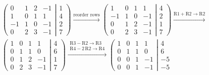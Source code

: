 \begin{align*}
  & \left(
  \begin{matrix}
  0 & 1 & 2 & -1 \\
  1 & 0 & 1 & 1 \\
  -1 & 1 & 0 & -1 \\
  0 & 2 & 3 & -1
  \end{matrix}
  \right.\left|\left.
  \begin{matrix}
  1 \\ 4 \\ 2 \\ 7 
  \end{matrix}
  \right)\right. 
  \xrightarrow{\text{reorder rows}}
  \left(
  \begin{matrix}
  1 & 0 & 1 & 1 \\
  -1 & 1 & 0 & -1 \\
  0 & 1 & 2 & -1 \\
  0 & 2 & 3 & -1
  \end{matrix}
  \right.\left|\left.
  \begin{matrix}
  4 \\ 2 \\ 1 \\ 7 
  \end{matrix}
  \right)\right.
  \xrightarrow{\text{R1}+\text{R2}\to\text{R2}} \\
  & \left(
  \begin{matrix}
  1 & 0 & 1 & 1 \\
  0 & 1 & 1 & 0 \\
  0 & 1 & 2 & -1 \\
  0 & 2 & 3 & -1
  \end{matrix}
  \right.\left|\left.
  \begin{matrix}
  4 \\ 6 \\ 1 \\ 7 
  \end{matrix}
  \right)\right.
  \xrightarrow{\substack{\text{R3}-\text{R2}\to\text{R3} \\
  \text{R4}-2\,\text{R2}\to\text{R4}}}
  \left(
  \begin{matrix}
  1 & 0 & 1 & 1 \\
  0 & 1 & 1 & 0 \\
  0 & 0 & 1 & -1 \\
  0 & 0 & 1 & -1
  \end{matrix}
  \right.\left|\left.
  \begin{matrix}
  4 \\ 6 \\ -5 \\ -5

\end{matrix}
\end{align*}
